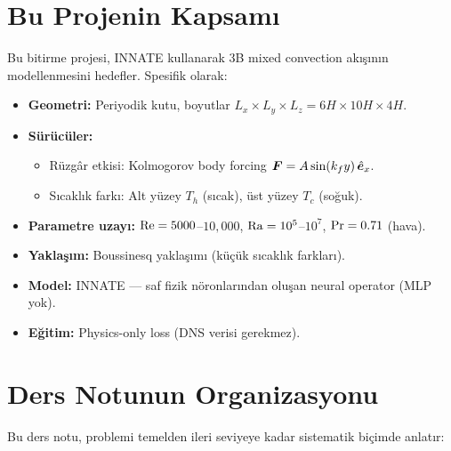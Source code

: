 \section{Bu Projenin Kapsamı}
\label{sec:kapsam}

Bu bitirme projesi, INNATE kullanarak 3B mixed convection akışının modellenmesini hedefler. Spesifik olarak:

\begin{itemize}
    \item \textbf{Geometri:} Periyodik kutu, boyutlar $L_x \times L_y \times L_z = 6H \times 10H \times 4H$.
    \item \textbf{Sürücüler:}
    \begin{itemize}
        \item Rüzgâr etkisi: Kolmogorov body forcing $\bm{F} = A \sin(k_f y)\,\hat{\bm{e}}_x$.
        \item Sıcaklık farkı: Alt yüzey $T_h$ (sıcak), üst yüzey $T_c$ (soğuk).
    \end{itemize}
    \item \textbf{Parametre uzayı:} $\mathrm{Re} = 5000$--$10{,}000$, \; $\mathrm{Ra} = 10^5$--$10^7$, \; $\mathrm{Pr} = 0.71$ (hava).
    \item \textbf{Yaklaşım:} Boussinesq yaklaşımı (küçük sıcaklık farkları).
    \item \textbf{Model:} INNATE --- saf fizik nöronlarından oluşan neural operator (MLP yok).
    \item \textbf{Eğitim:} Physics-only loss (DNS verisi gerekmez).
\end{itemize}


\section{Ders Notunun Organizasyonu}
\label{sec:organizasyon}

Bu ders notu, problemi temelden ileri seviyeye kadar sistematik biçimde anlatır:

